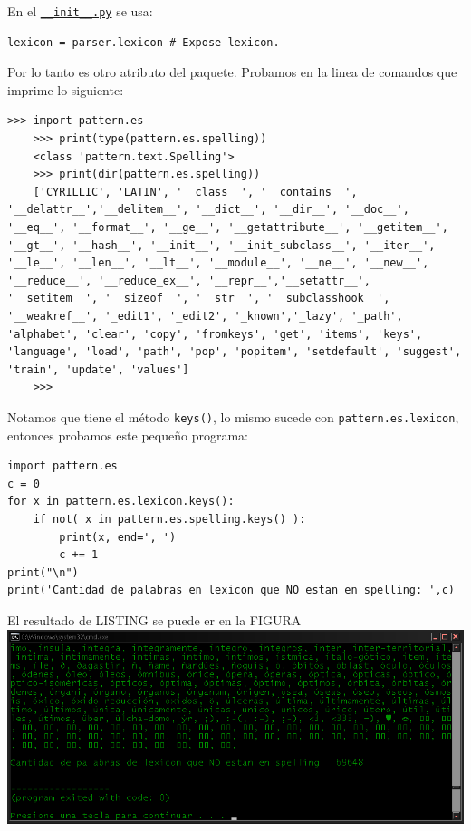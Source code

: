 En el
\href{https://github.com/clips/pattern/blob/5b85d998c30ddc6772b56310713530224466083a/pattern/text/es/__init__.py\#L220}{\texttt{\_\_init\_\_.py}}
se usa:
\begin{verbatim}
lexicon = parser.lexicon # Expose lexicon.
\end{verbatim}

Por lo tanto es otro atributo del paquete. Probamos en la linea de comandos que imprime lo siguiente:
\begin{Verbatim}[breaklines=true, breakanywhere=true]
    >>> import pattern.es
    >>> print(type(pattern.es.spelling))
    <class 'pattern.text.Spelling'>
    >>> print(dir(pattern.es.spelling))
    ['CYRILLIC', 'LATIN', '__class__', '__contains__', '__delattr__','__delitem__', '__dict__', '__dir__', '__doc__', '__eq__', '__format__', '__ge__', '__getattribute__', '__getitem__', '__gt__', '__hash__', '__init__', '__init_subclass__', '__iter__', '__le__', '__len__', '__lt__', '__module__', '__ne__', '__new__', '__reduce__', '__reduce_ex__', '__repr__','__setattr__', '__setitem__', '__sizeof__', '__str__', '__subclasshook__', '__weakref__', '_edit1', '_edit2', '_known','_lazy', '_path', 'alphabet', 'clear', 'copy', 'fromkeys', 'get', 'items', 'keys', 'language', 'load', 'path', 'pop', 'popitem', 'setdefault', 'suggest', 'train', 'update', 'values']
    >>>
\end{Verbatim}

Notamos que tiene el método \texttt{keys()}, lo mismo sucede con \texttt{pattern.es.lexicon}, entonces probamos este pequeño programa:
\begin{listing}
\begin{verbatim}
import pattern.es
c = 0
for x in pattern.es.lexicon.keys():
	if not( x in pattern.es.spelling.keys() ):
		print(x, end=', ')
		c += 1
print("\n")
print('Cantidad de palabras en lexicon que NO estan en spelling: ',c)
\end{verbatim}
\end{listing}
El resultado de LISTING se puede er en la FIGURA
\includegraphics[width=\textwidth,keepaspectratio]{img/lexnspe.png}

